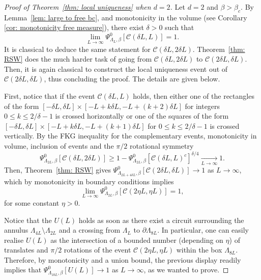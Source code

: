 \documentclass[11pt,a4paper]{article}
\theoremstyle{definition}
\numberwithin{equation}{section}
\begin{document}
\begin{proof}[Proof of Theorem~\textup{\ref{thm: local uniqueness}} when $d=2$] 

Let $d=2$ and $\beta>\beta_c$. By Lemma~\ref{lem: large to free bc}, %
and monotonicity in the volume (see Corollary \ref{cor: monotonicity free measure}), there exist $\delta>0$ such that
\begin{equation}\label{eq:2Dcrossing_delta}
    \lim_{L\to\infty} \Psi^0_{\Lambda_{L},\beta}[\mathcal{C}(\delta L,L)] = 1.
\end{equation}
It is classical to deduce the same statement for $\mathcal{C}(\delta L,2\delta L)$. Theorem~\ref{thm: RSW} does the much harder task of going from $\mathcal{C}(\delta L,2\delta L)$ to $\mathcal{C}(2\delta L,\delta L)$. Then, it is again classical to construct the local uniqueness event out of $\mathcal{C}(2\delta L,\delta L)$, thus concluding the proof.
The details are given below.

First, notice that if the event $\mathcal{C}(\delta L,L)$ holds, then either one of the rectangles of the form $[-\delta L, \delta L]\times[-L+k\delta L,-L+(k+2)\delta L]$ for integers $0\leq k\leq 2/\delta - 1$ is crossed horizontally or one of the squares of the form $[-\delta L ,\delta L]\times[-L+k\delta L,-L+(k+1)\delta L]$ for $0\leq k\leq 2/\delta-1$ is crossed vertically. By the FKG inequality for the complementary events, monotonicity in volume, inclusion of events and the $\pi/2$ rotational symmetry
\begin{equation}
\Psi^0_{\Lambda_{2L},\beta}[\mathcal{C}(\delta L,2\delta L)]\geq 1-\Psi^0_{\Lambda_{2L},\beta}[\mathcal{C}(\delta L,L)^c]^{\delta/4} \underset{L\rightarrow \infty}{\longrightarrow} 1.    
\end{equation}
Then, Theorem~\ref{thm: RSW} gives $\Psi^0_{\Lambda_{2L +4\delta L},\beta}[\mathcal{C}(2\delta L,\delta L)] \to 1$ as $L\to\infty$, which by monotonicity in boundary conditions implies
\begin{equation}
  \lim_{L\rightarrow \infty}\Psi^0_{\Lambda_{2L},\beta}[\mathcal{C}(2\eta L,\eta L)] =1,
\end{equation}
for some constant $\eta>0$. 

Notice that the $U(L)$ holds as soon as there exist a circuit surrounding the annulus $\Lambda_{4L}\setminus \Lambda_{2L}$ and a crossing from $\Lambda_L$ to $\partial \Lambda_{8L}$. In particular, one can easily realise $U(L)$ as the intersection of a bounded number (depending on $\eta$) of translates and $\pi/2$ rotations of the event $\mathcal{C}(2\eta L,\eta L)$ within the box $\Lambda_{8L}$. Therefore, by monotonicity and a union bound, the previous display readily implies that $\Psi^0_{\Lambda_{10L},\beta}[U(L)] \to 1$ as $L\to\infty$, as we wanted to prove.
\end{proof}
\end{document}
